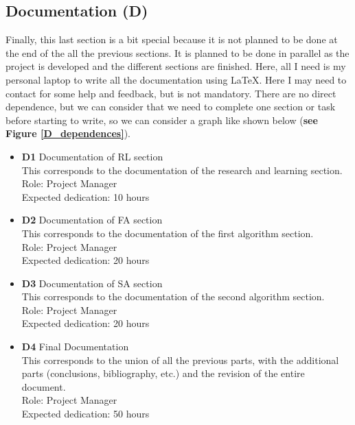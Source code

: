 \subsection{Documentation \textbf{(D)}}
Finally, this last section is a bit special because it is not planned to be done at the end of the all the previous sections.
It is planned to be done in parallel as the project is developed and the different sections are finished.
Here, all I need is my personal laptop to write all the documentation using \LaTeX.
Here I may need to contact for some help and feedback, but is not mandatory.
There are no direct dependence, but we can consider that we need to complete one section or task before starting to write, so we can consider a graph like shown below (\textbf{see Figure \ref{D_dependences}}).
\begin{itemize}
    \item \textbf{D1} Documentation of RL section \\
        This corresponds to the documentation of the research and learning section. \\
        Role: Project Manager \\
        Expected dedication: 10 hours
    \item \textbf{D2} Documentation of FA section\\
        This corresponds to the documentation of the first algorithm section. \\
        Role: Project Manager \\
        Expected dedication: 20 hours
    \item \textbf{D3} Documentation of SA section \\
        This corresponds to the documentation of the second algorithm section. \\
        Role: Project Manager \\
        Expected dedication: 20 hours
    \item \textbf{D4} Final Documentation \\
    This corresponds to the union of all the previous parts, with the additional parts (conclusions, bibliography, etc.) and the revision of the entire document. \\
    Role: Project Manager \\
    Expected dedication: 50 hours        
\end{itemize}
